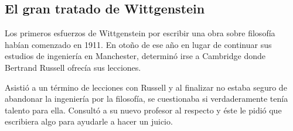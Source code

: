 

      \subsection{El gran tratado de Wittgenstein}


      Los primeros esfuerzos de Wittgenstein por escribir una obra sobre filosofía
      habían comenzado en 1911. En otoño de ese año en lugar de continuar sus estudios
      de ingeniería en Manchester, determinó irse a Cambridge donde Bertrand Russell
      ofrecía sus lecciones.

      Asistió a un término de lecciones con Russell y al finalizar no estaba seguro de
      abandonar la ingeniería por la filosofía, se cuestionaba si verdaderamente tenía
      talento para ella. Consultó a su nuevo profesor al respecto y éste le pidió que
      escribiera algo para ayudarle a hacer un juicio.

